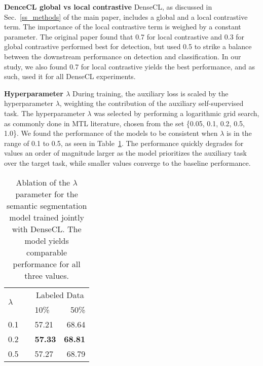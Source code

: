 \documentclass[10pt,twocolumn,letterpaper]{article}
\newcommand{\parsection}[1]{\vspace{1mm}\noindent\textbf{#1 }}
\begin{document}
\parsection{DenceCL global vs local contrastive}
DenseCL, as discussed in 
Sec.~\ref{ss_methods}
of the main paper, includes a global and a local contrastive term. The importance of the local contrastive term is weighed by a constant parameter. The original paper found that 0.7 for local contrastive and 0.3 for global contrastive performed best for detection, but used 0.5 to strike a balance between the downstream performance on detection and classification. In our study, we also found 0.7 for local contrastive yields the best performance, and as such, used it for all DenseCL experiments.

\parsection{Hyperparameter $\lambda$}
During training, the auxiliary loss is scaled by the hyperparameter $\lambda$, weighting the contribution of the auxiliary self-supervised task.
The hyperparameter $\lambda$ was selected by performing a logarithmic grid search, as commonly done in MTL literature, chosen from the set \{0.05, 0.1, 0.2, 0.5, 1.0\}.
We found the performance of the models to be consistent when $\lambda$ is in the range of 0.1 to 0.5, as seen in Table~\ref{table:sup_semseg_lambda}.
The performance quickly degrades for values an order of magnitude larger as the model prioritizes the auxiliary task over the target task, while smaller values converge to the baseline performance.

\begin{table}[h]
  \centering
   \caption{Ablation of the $\lambda$ parameter for the semantic segmentation model trained jointly with DenseCL. The model yields comparable performance for all three values.}
\footnotesize
  \begin{tabularx}{0.4\linewidth}{@{}lcXr@{}}
    \toprule
\multirow{2}{*}{$\lambda$} &&    \multicolumn{2}{c}{Labeled Data} \\
    \cmidrule{2-4} 
    && 10\% & 50\% \\
    \midrule
    
	0.1  && 57.21  & 68.64 \\
	0.2 && \textbf{57.33} & \textbf{68.81} \\
	0.5 && 57.27 & 68.79 \\
    \bottomrule
  \end{tabularx}
\label{table:sup_semseg_lambda}
\vspace{4.3in}
\end{table}
 

{\small


}
\end{document}
